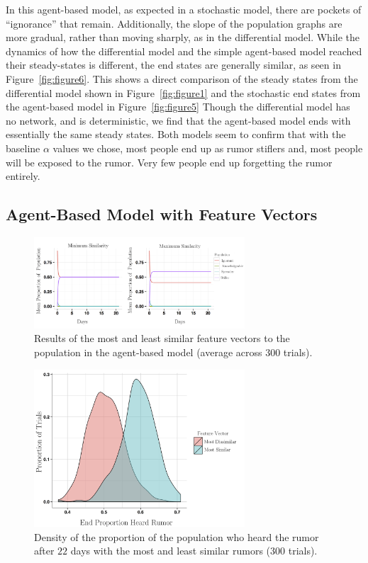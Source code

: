 In this agent-based model, as expected in a stochastic model, there are pockets of ``ignorance'' that remain.
Additionally, the slope of the population graphs are more gradual, rather than moving sharply, as in the differential model.
While the dynamics of how the differential model and the simple agent-based model reached their steady-states is  different, the end states are generally similar, as seen in Figure~\ref{fig:figure6}.
This shows a direct comparison of the steady states from the differential model shown in Figure~\ref{fig:figure1} and the stochastic end states from the agent-based model in Figure~\ref{fig:figure5}  Though the differential model has no network, and is deterministic, we find that the agent-based model ends with essentially the same steady states.
Both models seem to confirm that with the baseline $\alpha$ values we chose, most people end up as rumor stiflers and, most people will be exposed to the rumor.
Very few people end up forgetting the rumor entirely.

\subsection{Agent-Based Model with Feature Vectors}
\label{subsec:featvect}

\begin{figure}[H]
\captionsetup{width=0.8\textwidth}
\centering
    \includegraphics[width=0.7\textwidth]{figures/figure7}
  \caption{ Results of the most and least similar feature vectors to the population in the agent-based model (average across $ 300 $ trials).}
\label{fig:figure7}
\end{figure}

\begin{figure}[H]
\captionsetup{width=0.8\textwidth}
\centering
    \includegraphics[width=0.7\textwidth]{figures/figure8}
  \caption{ Density of the proportion of the population who heard the rumor after $ 22 $ days with the most and least similar rumors ($ 300 $ trials).}
\label{fig:figure8}
\end{figure}

